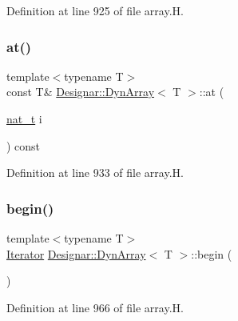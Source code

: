 Definition at line 925 of file array.\+H.

\mbox{\label{class_designar_1_1_dyn_array_a0bb20c2467a91bad1577fae7bed15828}} 
\subsubsection{\texorpdfstring{at()}{at()}\hspace{0.1cm}{\footnotesize\ttfamily [2/2]}}
{\footnotesize\ttfamily template$<$typename T$>$ \\
const T\& \hyperlink{class_designar_1_1_dyn_array}{Designar\+::\+Dyn\+Array}$<$ T $>$\+::at (\begin{DoxyParamCaption}\item[{\hyperlink{namespace_designar_aa72662848b9f4815e7bf31a7cf3e33d1}{nat\+\_\+t}}]{i }\end{DoxyParamCaption}) const\hspace{0.3cm}{\ttfamily [inline]}}



Definition at line 933 of file array.\+H.

\mbox{\label{class_designar_1_1_dyn_array_aa8032abbe4db89827ac88aa1ea932712}} 
\subsubsection{\texorpdfstring{begin()}{begin()}\hspace{0.1cm}{\footnotesize\ttfamily [1/2]}}
{\footnotesize\ttfamily template$<$typename T$>$ \\
\hyperlink{class_designar_1_1_dyn_array_1_1_iterator}{Iterator} \hyperlink{class_designar_1_1_dyn_array}{Designar\+::\+Dyn\+Array}$<$ T $>$\+::begin (\begin{DoxyParamCaption}{ }\end{DoxyParamCaption})\hspace{0.3cm}{\ttfamily [inline]}}



Definition at line 966 of file array.\+H.

\mbox{\label{class_designar_1_1_dyn_array_a36886c618a763286ec179f7fc7cffa68}} 
